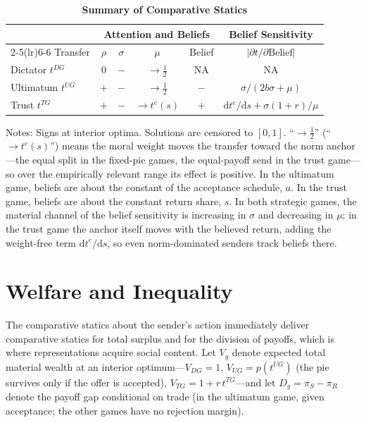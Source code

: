\documentclass[11pt]{article}
\theoremstyle{plain}
\theoremstyle{remark}
\begin{document}
\begin{table}[H]
\centering
\small
\renewcommand{\arraystretch}{1.2}
\caption{\textbf{Summary of Comparative Statics}}
\label{tab:cs_summary}
\begin{tabular}{l cccc c}
\toprule
& \multicolumn{4}{c}{Attention and Beliefs} & Belief Sensitivity \\
\cmidrule(lr){2-5}\cmidrule(lr){6-6}
Transfer & $\rho$ & $\sigma$ & $\mu$ & Belief & $|\partial t/\partial \text{Belief}|$ \\
\midrule
Dictator $t^{DG}$ & $0$ & $-$ & $\to\tfrac12$ & NA & NA \\
Ultimatum $t^{UG}$ & $+$ & $-$ & $\to\tfrac12$ & $-$ & $\sigma/(2b\sigma+\mu)$ \\
Trust $t^{TG}$ & $+$ & $-$ & $\to t^{e}(s)$ & $+$ & $\mathrm{d}t^{e}/\mathrm{d}s+\sigma(1+r)/\mu$ \\
\bottomrule
\end{tabular}
\begin{flushleft}
\footnotesize Notes: Signs at interior optima. Solutions are censored to $[0,1]$. ``$\to\tfrac12$'' (``$\to t^{e}(s)$'') means the moral weight moves the transfer toward the norm anchor---the equal split in the fixed-pie games, the equal-payoff send in the trust game---so over the empirically relevant range its effect is positive. In the ultimatum game, beliefs are about the constant of the acceptance schedule, $a$. In the trust game, beliefs are about the constant return share, $s$. In both strategic games, the material channel of the belief sensitivity is increasing in $\sigma$ and decreasing in $\mu$; in the trust game the anchor itself moves with the believed return, adding the weight-free term $\mathrm{d}t^{e}/\mathrm{d}s$, so even norm-dominated senders track beliefs there.
\end{flushleft}
\end{table}

\section{Welfare and Inequality}
\label{sec:welfare}

The comparative statics about the sender's action immediately deliver comparative statics for total surplus and for the division of payoffs, which is where representations acquire social content. Let $V_g$ denote expected total material wealth at an interior optimum---$V_{DG}=1$, $V_{UG}=p(t^{UG})$ (the pie survives only if the offer is accepted), $V_{TG}=1+r\,t^{TG}$---and let $D_g=\pi_S-\pi_R$ denote the payoff gap conditional on trade (in the ultimatum game, given acceptance; the other games have no rejection margin).
\end{document}
